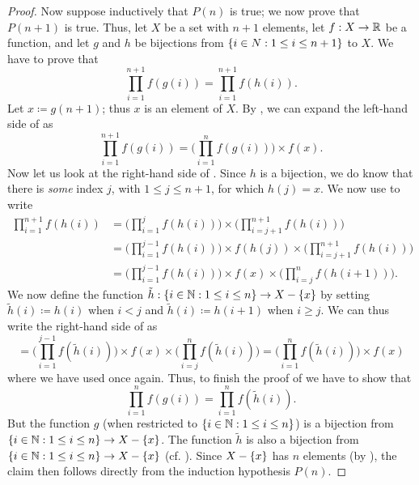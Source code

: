 \begin{proof}
  Now suppose inductively that \(P(n)\) is true;
  we now prove that \(P(n + 1)\) is true.
  Thus, let \(X\) be a set with \(n + 1\) elements, let \(f : X \to \mathbb{R}\) be a function, and let \(g\) and \(h\) be bijections from \(\left\lbrace i \in N : 1 \leq i \leq n + 1\right\rbrace\) to \(X\).
  We have to prove that
  \[
    \prod_{i = 1}^{n + 1} f(g(i)) = \prod_{i = 1}^{n + 1} f(h(i)). \tag{i:ac:7.1}\label{i:eq:ac:7.1}
  \]
  Let \(x \coloneqq g(n + 1)\);
  thus \(x\) is an element of \(X\).
  By , we can expand the left-hand side of  as
  \[
    \prod_{i = 1}^{n + 1} f(g(i)) = \Bigg(\prod_{i = 1}^n f(g(i))\Bigg) \times f(x).
  \]
  Now let us look at the right-hand side of .
  Since \(h\) is a bijection, we do know that there is \emph{some} index \(j\), with \(1 \leq j \leq n + 1\), for which \(h(j) = x\).
  We now use  to write
  \begin{align*}
    \prod_{i = 1}^{n + 1} f(h(i)) & = \Bigg(\prod_{i = 1}^j f(h(i))\Bigg) \times \Bigg(\prod_{i = j + 1}^{n + 1} f(h(i))\Bigg)                      \\
                                  & = \Bigg(\prod_{i = 1}^{j - 1} f(h(i))\Bigg) \times f(h(j)) \times \Bigg(\prod_{i = j + 1}^{n + 1} f(h(i))\Bigg) \\
                                  & = \Bigg(\prod_{i = 1}^{j - 1} f(h(i))\Bigg) \times f(x) \times \Bigg(\prod_{i = j}^n f(h(i + 1))\Bigg).
  \end{align*}
  We now define the function \(\tilde{h} : \left\lbrace i \in \mathbb{N} : 1 \leq i \leq n\right\rbrace \to X - \left\lbrace x\right\rbrace\) by setting \(\tilde{h}(i) \coloneqq h(i)\) when \(i < j\) and \(\tilde{h}(i) \coloneqq h(i + 1)\) when \(i \geq j\).
  We can thus write the right-hand side of  as
  \[
    = \Bigg(\prod_{i = 1}^{j - 1} f(\tilde{h}(i))\Bigg) \times f(x) \times \Bigg(\prod_{i = j}^n f(\tilde{h}(i))\Bigg) = \Bigg(\prod_{i = 1}^n f(\tilde{h}(i))\Bigg) \times f(x)
  \]
  where we have used  once again.
  Thus, to finish the proof of  we have to show that
  \[
    \prod_{i = 1}^n f(g(i)) = \prod_{i = 1}^n f(\tilde{h}(i)). \tag{i:ac:7.2}\label{i:eq:ac:7.2}
  \]
  But the function \(g\) (when restricted to \(\left\lbrace i \in \mathbb{N} : 1 \leq i \leq n\right\rbrace\)) is a bijection from \(\left\lbrace i \in \mathbb{N} : 1 \leq i \leq n\right\rbrace \to X - \left\lbrace x\right\rbrace\).
  The function \(\tilde{h}\) is also a bijection from \(\left\lbrace i \in \mathbb{N} : 1 \leq i \leq n\right\rbrace \to X - \left\lbrace x\right\rbrace\) (cf. ).
  Since \(X - \left\lbrace x\right\rbrace\) has \(n\) elements (by ), the claim  then follows directly from the induction hypothesis \(P(n)\).
\end{proof}

